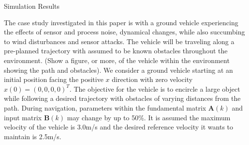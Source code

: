 
\begin{section}{Simulation Results}
\label{sec:simulation}


The case study investigated in this paper is with a ground vehicle experiencing the effects of sensor and process noise, dynamical changes, while also succumbing to wind disturbances and sensor attacks. The vehicle will be traveling along a pre-planned trajectory with assumed to be known obstacles throughout the environment. (Show a figure, or more, of the vehicle within the environment showing the path and obstacles). We consider a ground vehicle starting at an initial position facing the positive $x$ direction with zero velocity $x(0)=(0,0,0,0)^T$. The objective for the vehicle is to encircle a large object while following a desired trajectory with obstacles of varying distances from the path. During navigation, parameters within the fundamental matrix $\bm{A}(k)$ and input matrix $\bm{B}(k)$ may change by up to 50\%. It is assumed the maximum velocity of the vehicle is 3.0m/s and the desired reference velocity it wants to maintain is 2.5m/s. 










\end{section}

